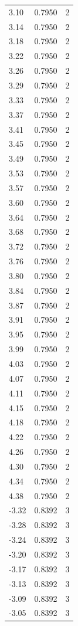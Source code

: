 \begin{longtable}{lrr}
  3.10 & 0.7950 & 2 \\
  3.14 & 0.7950 & 2 \\
  3.18 & 0.7950 & 2 \\
  3.22 & 0.7950 & 2 \\
  3.26 & 0.7950 & 2 \\
  3.29 & 0.7950 & 2 \\
  3.33 & 0.7950 & 2 \\
  3.37 & 0.7950 & 2 \\
  3.41 & 0.7950 & 2 \\
  3.45 & 0.7950 & 2 \\
  3.49 & 0.7950 & 2 \\
  3.53 & 0.7950 & 2 \\
  3.57 & 0.7950 & 2 \\
  3.60 & 0.7950 & 2 \\
  3.64 & 0.7950 & 2 \\
  3.68 & 0.7950 & 2 \\
  3.72 & 0.7950 & 2 \\
  3.76 & 0.7950 & 2 \\
  3.80 & 0.7950 & 2 \\
  3.84 & 0.7950 & 2 \\
  3.87 & 0.7950 & 2 \\
  3.91 & 0.7950 & 2 \\
  3.95 & 0.7950 & 2 \\
  3.99 & 0.7950 & 2 \\
  4.03 & 0.7950 & 2 \\
  4.07 & 0.7950 & 2 \\
  4.11 & 0.7950 & 2 \\
  4.15 & 0.7950 & 2 \\
  4.18 & 0.7950 & 2 \\
  4.22 & 0.7950 & 2 \\
  4.26 & 0.7950 & 2 \\
  4.30 & 0.7950 & 2 \\
  4.34 & 0.7950 & 2 \\
  4.38 & 0.7950 & 2 \\
  -3.32 & 0.8392 & 3 \\
  -3.28 & 0.8392 & 3 \\
  -3.24 & 0.8392 & 3 \\
  -3.20 & 0.8392 & 3 \\
  -3.17 & 0.8392 & 3 \\
  -3.13 & 0.8392 & 3 \\
  -3.09 & 0.8392 & 3 \\
  -3.05 & 0.8392 & 3 \\

\end{longtable}
